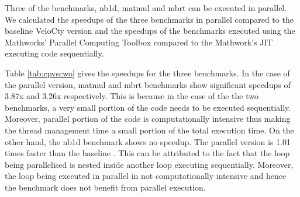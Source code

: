 Three of the \matlab benchmarks, \textsf{nb1d}, \textsf{matmul} and \textsf{mbrt} can be executed in parallel. We calculated the speedups of the three benchmarks in parallel compared to the baseline VeloCty version and the speedups of the benchmarks executed using the Mathworks' Parallel Computing Toolbox\cite{matlabpar} compared to the Mathwork's \matlab JIT executing code sequentially.

 Table \ref{tab:cpvscwo} gives the speedups for the three benchmarks. In the case of the \velocty parallel version, matmul and mbrt benchmarks show significant speedups of 3.87x and 3.26x respectively. This is because in the case of the the two benchmarks, a very small portion of the code needs to be executed sequentially. Moreover, parallel portion of the code is computationally intensive thus making the thread management time a small portion of the total execution time. On the other hand, the nb1d benchmark shows no speedup. The parallel version is 1.01 times faster than the baseline \velocty. This can be attributed to the fact that the loop being parallelised is nested inside another loop executing sequentially. Moreover, the loop being executed in parallel in not computationally intensive and hence the benchmark does not benefit from parallel execution. 

